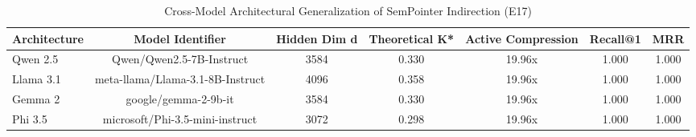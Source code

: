 \begin{table}
\caption{Cross-Model Architectural Generalization of SemPointer Indirection (E17)}
\label{tab:cross_model}
\begin{tabular}{lcccccc}
\toprule
Architecture & Model Identifier & Hidden Dim d & Theoretical K* & Active Compression & Recall@1 & MRR \\
\midrule
Qwen 2.5 & Qwen/Qwen2.5-7B-Instruct & 3584 & 0.330 & 19.96x & 1.000 & 1.000 \\
Llama 3.1 & meta-llama/Llama-3.1-8B-Instruct & 4096 & 0.358 & 19.96x & 1.000 & 1.000 \\
Gemma 2 & google/gemma-2-9b-it & 3584 & 0.330 & 19.96x & 1.000 & 1.000 \\
Phi 3.5 & microsoft/Phi-3.5-mini-instruct & 3072 & 0.298 & 19.96x & 1.000 & 1.000 \\
\bottomrule
\end{tabular}
\end{table}
